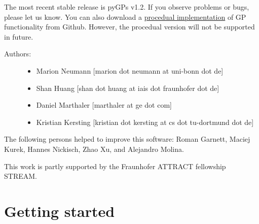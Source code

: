 \documentclass[letterpaper,10pt,english]{sphinxmanual}
\begin{document}
The most recent stable release is pyGPs v1.2. If you observe problems or bugs, please let us know.
You can also download a \href{https://github.com/marionmari/pyGP\_PR/}{procedual implementation} of GP functionality from Github. However, the procedual version will not be supported in future.
\begin{description}
\item[{Authors:}] \leavevmode\begin{itemize}
\item {} 
Marion Neumann {[}marion dot neumann at uni-bonn dot de{]}

\item {} 
Shan Huang {[}shan dot huang at iais dot fraunhofer dot de{]}

\item {} 
Daniel Marthaler {[}marthaler at ge dot com{]}

\item {} 
Kristian Kersting {[}kristian dot kersting at cs dot tu-dortmund dot de{]}

\end{itemize}

\end{description}

The following persons helped to improve this software: Roman Garnett, Maciej Kurek, Hannes Nickisch, Zhao Xu, and Alejandro Molina.

This work is partly supported by the Fraunhofer ATTRACT fellowship STREAM.


\section{Getting started}
\label{index:getting-started}
\end{document}
